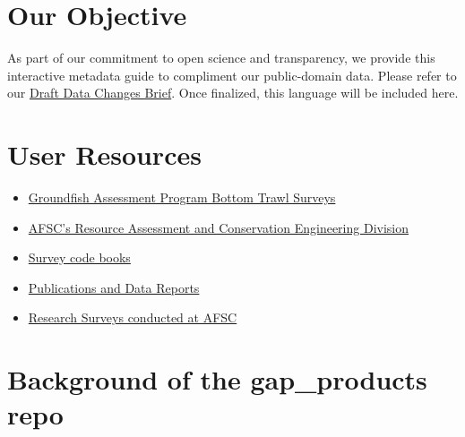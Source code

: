 \documentclass[
  letterpaper,
  oneside,
  open=any]{scrbook}
\providecommand{\tightlist}{%
  \setlength{\itemsep}{0pt}\setlength{\parskip}{0pt}}\usepackage{longtable,booktabs,array}
\begin{document}
\hypertarget{our-objective}{%
\section*{Our Objective}\label{our-objective}}


As part of our commitment to open science and transparency, we provide
this interactive metadata guide to compliment our public-domain data.
Please refer to our
\href{https://docs.google.com/document/d/1ie0it6G_V_PrpO1fYe-731Fvubuahn2yi0ixBIpaYO8/edit?usp=sharing}{Draft
Data Changes Brief}. Once finalized, this language will be included
here.

\hypertarget{user-resources}{%
\section*{User Resources}\label{user-resources}}


\begin{itemize}
\tightlist
\item
  \href{https://www.fisheries.noaa.gov/alaska/science-data/groundfish-assessment-program-bottom-trawl-surveys}{Groundfish
  Assessment Program Bottom Trawl Surveys}
\item
  \href{https://www.fisheries.noaa.gov/about/resource-assessment-and-conservation-engineering-division}{AFSC's
  Resource Assessment and Conservation Engineering Division}
\item
  \href{https://www.fisheries.noaa.gov/resource/document/groundfish-survey-species-code-manual-and-data-codes-manual}{Survey
  code books}
\item
  \href{https://repository.library.noaa.gov/}{Publications and Data
  Reports}
\item
  \href{https://www.fisheries.noaa.gov/alaska/ecosystems/alaska-fish-research-surveys}{Research
  Surveys conducted at AFSC}
\end{itemize}

\hypertarget{background-of-the-gap_products-repo}{%
\section*{Background of the gap\_products
repo}\label{background-of-the-gap_products-repo}}
\end{document}
